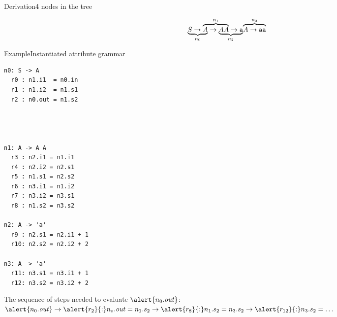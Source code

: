 
\begin{frame}[fragile=singleslide]{Derivation}{4 nodes in the tree}

\[
\lefteqn{\underbrace{\phantom{S \rightarrow A}}_{n_0}} S \rightarrow
\lefteqn{\overbrace{\phantom{A \rightarrow A A}}^{n_1}} A \rightarrow 
\lefteqn{\underbrace{\phantom{A A \rightarrow \texttt{a}}}_{n_2}} A A \rightarrow \texttt{a}
\lefteqn{\overbrace{A \rightarrow \texttt{aa}}^{n_3}}
\]

\begin{center}
\scalebox{0.75}{\begin{forest}
  [
    $n_0$, name=n0
    [ $n_1$
        [$n_2$ [$\texttt{a}$]]
        [$n_3$ [$\texttt{a}$]]
    ]
  ]
\end{forest}}
\end{center}

\end{frame}


\begin{frame}[fragile=singleslide]{Example}{Instantiated attribute grammar}


\begin{multicols}{3}
\begin{Verbatim}[fontsize=\scriptsize]
n0: S -> A
  r0 : n1.i1  = n0.in
  r1 : n1.i2  = n1.s1
  r2 : n0.out = n1.s2




n1: A -> A A
  r3 : n2.i1 = n1.i1
  r4 : n2.i2 = n2.s1
  r5 : n1.s1 = n2.s2
  r6 : n3.i1 = n1.i2
  r7 : n3.i2 = n3.s1
  r8 : n1.s2 = n3.s2

n2: A -> 'a'
  r9 : n2.s1 = n2.i1 + 1
  r10: n2.s2 = n2.i2 + 2
    
n3: A -> 'a'
  r11: n3.s1 = n3.i1 + 1
  r12: n3.s2 = n3.i2 + 2
\end{Verbatim}
\end{multicols}

The sequence of steps needed to evaluate $\alert{n_0.\mathit{out}}$:
$\alert{n_0.\mathit{out}} \to \alert{r_2}{:} n_o.\mathit{out} = n_1.s_2 \to \alert{r_8}{:} n_1.s_2 = n_3.s_2 \to \alert{r_{12}}{:}n_3.s_2 = \dots$

\end{frame}

